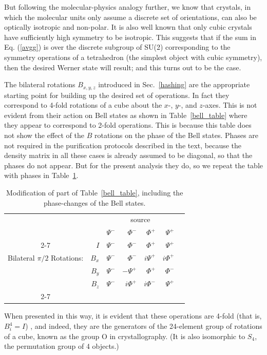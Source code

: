 But following the molecular-physics analogy further, we know that
crystals, in which the molecular units only assume a discrete set of
orientations, can also be optically isotropic and non-polar.  It is
also well known that only cubic crystals have sufficiently high
symmetry to be isotropic.  This suggests that if the sum in
Eq. (\ref{avgg}) is over the discrete subgroup of SU(2) corresponding
to the symmetry operations of a tetrahedron (the simplest object with
cubic symmetry), then the desired Werner state will result; and this
turns out to be the case.
 
The bilateral rotations $B_{x,y,z}$ introduced in Sec.~\ref{hashing}
are the appropriate starting point for building up the desired set of
operations.  In fact they correspond to 4-fold rotations of a cube
about the $x$-, $y$-, and $z$-axes.  This is not evident from their
action on Bell states as shown in Table~\ref{bell_table}
where they appear to correspond to 2-fold operations.  This is because
this table does not show the effect of the $B$ rotations on the phase
of the Bell states.  Phases are not required in the purification
protocols described in the text, because the density matrix in all
these cases is already assumed to be diagonal, so that the phases do
not appear.  But for the present analysis they do, so we repeat the
table with phases in Table~\ref{Bwithphase}.
 
\begin{table}[htbp]
\begin{tabular}{cr|rrrr|l}
 & &\multicolumn{4}{|c|}{source}&\\
 & &$\Psi^-$&$\Phi^-$&$\Phi^+$&$\Psi^+$&\\
\cline{2-7}
 &$I$&$\Psi^-$&$\Phi^-$&$\Phi^+$&$\Psi^+$&\\
Bilateral $\pi/2$ Rotations:&$B_x$&$\Psi^-$&$\Phi^-$&$i\Psi^+$&$i\Phi^+$&\\
 &$B_y$&$\Psi^-$&$-\Psi^+$&$\Phi^+$&$\Phi^-$&\\
 &$B_z$&$\Psi^-$&$i\Phi^+$&$i\Phi^-$&$\Psi^+$&\\
\cline{2-7}
\end{tabular}
\caption[B rotations with phases]{Modification of part of Table~\protect\ref{bell_table},
including the phase-changes of the Bell states.}
\label{Bwithphase}
\end{table}
 
When presented in this way, it is evident that these operations are
4-fold (that is, $B_i^4=I$) , and indeed, they are the generators of
the 24-element group of rotations of a cube, known as the group O in
crystallography\cite{Tink}.  (It is also isomorphic to $S_4$, the
permutation group of 4 objects.)
 
